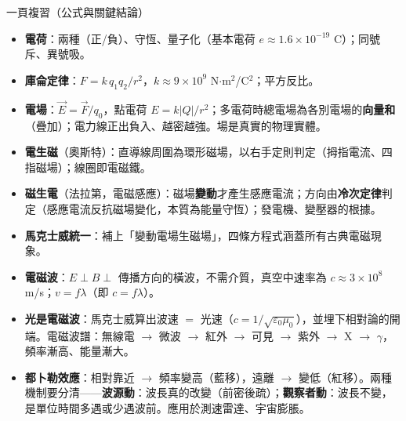 \documentclass[11pt]{article}
\begin{document}
\begin{補充框}{一頁複習（公式與關鍵結論）}
\begin{itemize}\setlength{\itemsep}{2pt}
\item \textbf{電荷}：兩種（正/負）、守恆、量子化（基本電荷 $e\approx1.6\times10^{-19}$ C）；同號斥、異號吸。
\item \textbf{庫侖定律}：$F=k\,q_1q_2/r^2$，$k\approx9\times10^9$ N$\cdot$m$^2$/C$^2$；平方反比。
\item \textbf{電場}：$\vec E=\vec F/q_0$，點電荷 $E=k|Q|/r^2$；多電荷時總電場為各別電場的\textbf{向量和}（疊加）；電力線正出負入、越密越強。場是真實的物理實體。
\item \textbf{電生磁}（奧斯特）：直導線周圍為環形磁場，以右手定則判定（拇指電流、四指磁場）；線圈即電磁鐵。
\item \textbf{磁生電}（法拉第，電磁感應）：磁場\textbf{變動}才產生感應電流；方向由\textbf{冷次定律}判定（感應電流反抗磁場變化，本質為能量守恆）；發電機、變壓器的根據。
\item \textbf{馬克士威統一}：補上「變動電場生磁場」，四條方程式涵蓋所有古典電磁現象。
\item \textbf{電磁波}：$E\perp B\perp$ 傳播方向的橫波，不需介質，真空中速率為 $c\approx3\times10^8$ m/s；$v=f\lambda$（即 $c=f\lambda$）。
\item \textbf{光是電磁波}：馬克士威算出波速 $=$ 光速（$c=1/\sqrt{\varepsilon_0\mu_0}$），並埋下相對論的開端。電磁波譜：無線電 $\rightarrow$ 微波 $\rightarrow$ 紅外 $\rightarrow$ 可見 $\rightarrow$ 紫外 $\rightarrow$ X $\rightarrow$ $\gamma$，頻率漸高、能量漸大。
\item \textbf{都卜勒效應}：相對靠近 $\rightarrow$ 頻率變高（藍移），遠離 $\rightarrow$ 變低（紅移）。兩種機制要分清——\textbf{波源動}：波長真的改變（前密後疏）；\textbf{觀察者動}：波長不變，是單位時間多遇或少遇波前。應用於測速雷達、宇宙膨脹。
\end{itemize}
\end{補充框}
\end{document}
